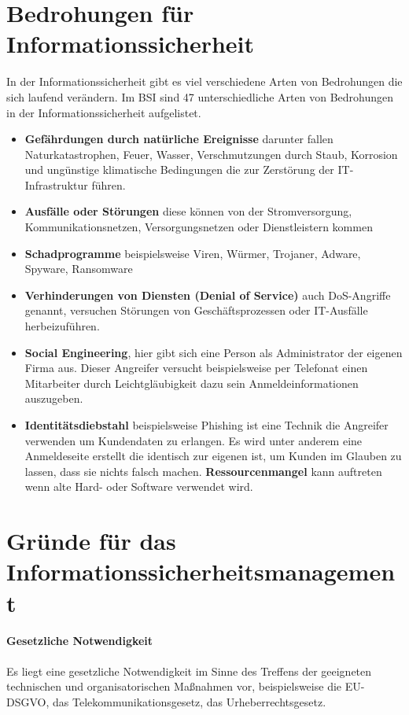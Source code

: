 \section{Bedrohungen für Informationssicherheit}
In der Informationssicherheit gibt es viel verschiedene Arten von Bedrohungen die sich laufend verändern. Im BSI sind 47 unterschiedliche Arten von Bedrohungen in der Informationssicherheit aufgelistet.

\begin{itemize}
	\item \textbf{Gefährdungen durch natürliche Ereignisse} darunter fallen Naturkatastrophen, Feuer, Wasser, Verschmutzungen durch Staub, Korrosion und ungünstige klimatische Bedingungen die zur Zerstörung der IT-Infrastruktur führen.
	\item \textbf{Ausfälle oder Störungen} diese können von der Stromversorgung, Kommunikationsnetzen, Versorgungsnetzen oder Dienstleistern kommen
	\item \textbf{Schadprogramme} beispielsweise Viren, Würmer, Trojaner, Adware, Spyware, Ransomware
	\item \textbf{Verhinderungen von Diensten (Denial of Service)} auch DoS-Angriffe genannt, versuchen Störungen von Geschäftsprozessen oder IT-Ausfälle herbeizuführen.
	\item \textbf{Social Engineering}, hier gibt sich eine Person als Administrator der eigenen Firma aus. Dieser Angreifer versucht beispielsweise per Telefonat einen Mitarbeiter durch Leichtgläubigkeit dazu  sein Anmeldeinformationen auszugeben.
	\item \textbf{Identitätsdiebstahl} beispielsweise Phishing ist eine Technik die Angreifer verwenden um Kundendaten zu erlangen. Es wird unter anderem eine Anmeldeseite erstellt die identisch zur eigenen ist, um Kunden im Glauben zu lassen, dass sie nichts falsch machen.
	\textbf{Ressourcenmangel} kann auftreten wenn alte Hard- oder Software verwendet wird. 
\end{itemize}

\section{Gründe für das Informationssicherheitsmanagement}
\paragraph{Gesetzliche Notwendigkeit}
Es liegt eine gesetzliche Notwendigkeit im Sinne des Treffens der geeigneten technischen und organisatorischen Maßnahmen vor, beispielsweise die EU-DSGVO, das Telekommunikationsgesetz, das Urheberrechtsgesetz.

